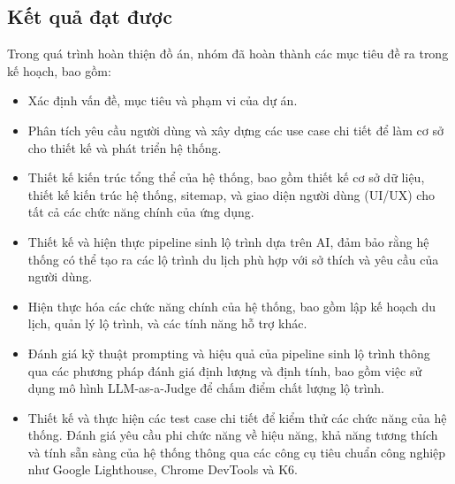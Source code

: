 \subsection{Kết quả đạt được}
Trong quá trình hoàn thiện đồ án, nhóm đã hoàn thành các mục tiêu đề ra trong kế hoạch, bao gồm:
\begin{itemize}
    \item Xác định vấn đề, mục tiêu và phạm vi của dự án.
    \item Phân tích yêu cầu người dùng và xây dựng các use case chi tiết để làm cơ sở cho thiết kế và phát triển hệ thống.
    \item Thiết kế kiến trúc tổng thể của hệ thống, bao gồm thiết kế cơ sở dữ liệu, thiết kế kiến trúc hệ thống, sitemap, và giao diện người dùng (UI/UX) cho tất cả các chức năng chính của ứng dụng.
    \item Thiết kế và hiện thực pipeline sinh lộ trình dựa trên AI, đảm bảo rằng hệ thống có thể tạo ra các lộ trình du lịch phù hợp với sở thích và yêu cầu của người dùng.
    \item Hiện thực hóa các chức năng chính của hệ thống, bao gồm lập kế hoạch du lịch, quản lý lộ trình, và các tính năng hỗ trợ khác.
    \item Đánh giá kỹ thuật prompting và hiệu quả của pipeline sinh lộ trình thông qua các phương pháp đánh giá định lượng và định tính, bao gồm việc sử dụng mô hình LLM-as-a-Judge để chấm điểm chất lượng lộ trình.
    \item Thiết kế và thực hiện các test case chi tiết để kiểm thử các chức năng của hệ thống. Đánh giá yêu cầu phi chức năng về hiệu năng, khả năng tương thích và tính sẵn sàng của hệ thống thông qua các công cụ tiêu chuẩn công nghiệp như Google Lighthouse, Chrome DevTools và K6.

\end{itemize}

